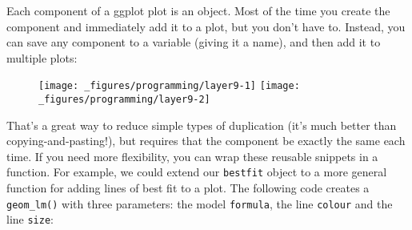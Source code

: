 Each component of a ggplot plot is an object. Most of the time you
create the component and immediately add it to a plot, but you don't
have to. Instead, you can save any component to a variable (giving it a
name), and then add it to multiple plots:

\begin{Shaded}
\begin{Highlighting}[]
\StringTok{ }\NormalTok{(}
   \NormalTok{, }
   \NormalTok{, }
   \NormalTok{(}\NormalTok{, }\NormalTok{), }
   
\NormalTok{)}
\StringTok{ }
\StringTok{  }\NormalTok{() +}\StringTok{ }
\StringTok{  }
\StringTok{ }
\StringTok{  }\NormalTok{() +}\StringTok{ }
\StringTok{  }
\end{Highlighting}
\end{Shaded}

\begin{figure}[H]
  \centering
  \texttt{[image: \_figures/programming/layer9-1]}%
  \texttt{[image: \_figures/programming/layer9-2]}
\end{figure}

That's a great way to reduce simple types of duplication (it's much
better than copying-and-pasting!), but requires that the component be
exactly the same each time. If you need more flexibility, you can wrap
these reusable snippets in a function. For example, we could extend our
\texttt{bestfit} object to a more general function for adding lines of
best fit to a plot. The following code creates a \texttt{geom\_lm()}
with three parameters: the model \texttt{formula}, the line
\texttt{colour} and the line \texttt{size}:

